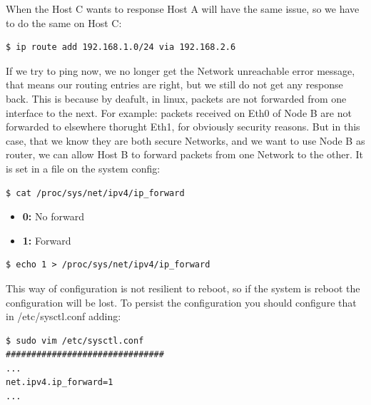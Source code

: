 \documentclass{article}
\newenvironment{blocktemplateIII}[1]{%
    \tcolorbox[beamer,%
    noparskip,breakable,
    ,colframe=Red,%
    colbacklower=LimeGreen!75!LightGreen,%
    title=#1]}%
    {\endtcolorbox}
\newenvironment{codetemplate}[1][]{%
  \mybasecolorbox[#1]
  \itshape
}{%
  \endmybasecolorbox
}
\begin{document}
When the Host C wants to response Host A will have the same issue, so we have to do the same on Host C:
\begin{codetemplate}{}
\begin{verbatim}
$ ip route add 192.168.1.0/24 via 192.168.2.6
\end{verbatim}
\end{codetemplate}

If we try to ping now, we no longer get the Network unreachable error message, that means our routing entries are right, but we still do not get any response back. This is because by deafult, in linux, packets are not forwarded from one interface to the next. For example: packets received on Eth0 of Node B are not forwarded to elsewhere thorught Eth1, for obviously security reasons. But in this case, that we know they are both secure Networks, and we want to use Node B as router, we can allow Host B to forward packets  from one Network to the other. It is set in a file on the system config:

\begin{codetemplate}{}
\begin{verbatim}
$ cat /proc/sys/net/ipv4/ip_forward
\end{verbatim}
\end{codetemplate}

\begin{itemize}
    \item \textbf{0:} No forward
    \item \textbf{1:} Forward
\end{itemize}


\begin{codetemplate}{}
\begin{verbatim}
$ echo 1 > /proc/sys/net/ipv4/ip_forward
\end{verbatim}
\end{codetemplate}

\begin{blocktemplateIII}{WARNING}
This way of configuration is not resilient to reboot, so if the system is reboot the configuration will be lost. To persist the configuration you should configure that in /etc/sysctl.conf adding:
\begin{codetemplate}{}
\begin{verbatim}
$ sudo vim /etc/sysctl.conf
###############################
...
net.ipv4.ip_forward=1
...
\end{verbatim}
\end{codetemplate}

\end{blocktemplateIII}
\end{document}
